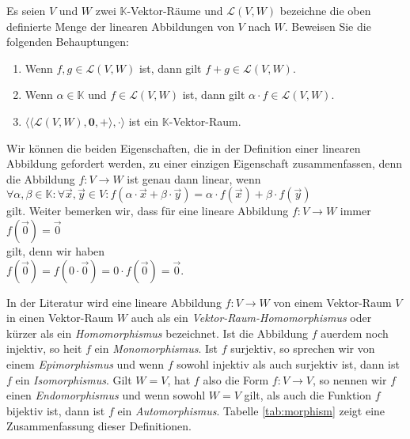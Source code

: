 \exercise
Es seien $V$ und $W$ zwei $\mathbb{K}$-Vektor-R\"{a}ume und $\mathcal{L}(V, W)$ bezeichne die oben
definierte Menge der linearen Abbildungen von $V$ nach $W$.  Beweisen Sie die folgenden Behauptungen:
\begin{enumerate}
\item Wenn $f,g \in \mathcal{L}(V,W)$ ist,  dann gilt $f+g \in \mathcal{L}(V, W)$.
\item Wenn $\alpha \in \mathbb{K}$ und $f \in \mathcal{L}(V,W)$ ist,  dann gilt  $\alpha \cdot f \in \mathcal{L}(V, W)$.
\item $\bigl\langle \langle \mathcal{L}(V, W), \mathbf{0}, + \rangle, \cdot \rangle$ ist ein $\mathbb{K}$-Vektor-Raum.
      \eoxs
\end{enumerate}

\remark
Wir k\"{o}nnen die beiden Eigenschaften, die in der Definition einer linearen Abbildung gefordert werden, zu 
einer einzigen Eigenschaft zusammenfassen, denn die Abbildung $f:V \rightarrow W$ ist genau dann linear, wenn
\\[0.2cm]
\hspace*{1.3cm}
$\forall \alpha, \beta \in \mathbb{K}: \forall \vec{x}, \vec{y} \in V: f(\alpha \cdot \vec{x} + \beta \cdot \vec{y}) = \alpha \cdot f(\vec{x}) + \beta \cdot f(\vec{y})$
\\[0.2cm]
gilt.  Weiter bemerken wir, dass f\"{u}r eine lineare Abbildung $f:V \rightarrow W$ immer
\\[0.2cm]
\hspace*{1.3cm}
$f(\vec{0}) = \vec{0}$
\\[0.2cm]
gilt, denn wir haben
\\[0.2cm]
\hspace*{1.3cm}
$f(\vec{0}) = f(0 \cdot \vec{0}) = 0 \cdot f(\vec{0}) = \vec{0}$.
\eoxs

\remark
In der Literatur wird eine lineare Abbildung $f:V \rightarrow W$ von einem Vektor-Raum $V$ in einen
Vektor-Raum $W$ auch als ein \emph{Vektor-Raum-Homomorphismus} oder k\"{u}rzer als ein
\emph{Homomorphismus} bezeichnet.  Ist die Abbildung $f$ au\3erdem noch injektiv, so hei\3t $f$ ein
\emph{Monomorphismus}.  Ist $f$ surjektiv, so sprechen wir von einem \emph{Epimorphismus} und wenn
$f$ sowohl injektiv als auch surjektiv ist, dann ist $f$ ein \emph{Isomorphismus}.  Gilt $W = V$,
hat $f$ also die Form $f: V \rightarrow V$, so nennen wir $f$ einen \emph{Endomorphismus} und wenn
sowohl $W=V$ gilt, als auch die Funktion $f$ bijektiv ist, dann ist $f$ ein \emph{Automorphismus}. 
Tabelle \ref{tab:morphism} zeigt eine Zusammenfassung dieser Definitionen.



